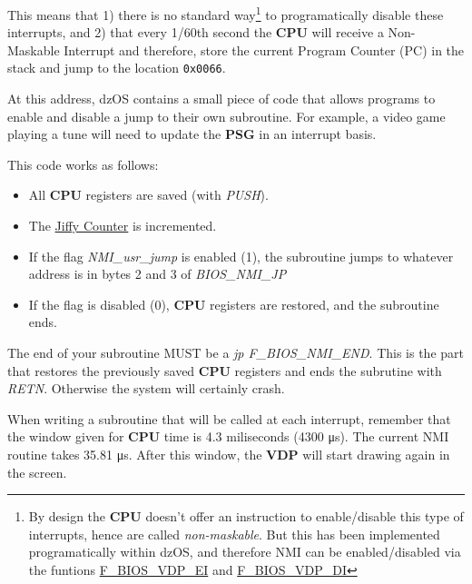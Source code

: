 \documentclass[a4paper,11pt]{article}
\begin{document}
    This means that 1) there is no standard way\footnote{By design the
    \textbf{CPU} doesn't offer an instruction to enable/disable this type of
    interrupts, hence are called \textit{non-maskable}. But this has been
    implemented programatically within dzOS, and therefore NMI can be
    enabled/disabled via the funtions \hyperref[func:fbiosvdpei]
    {F\_BIOS\_VDP\_EI} and \hyperref[func:fbiosvdpdi]{F\_BIOS\_VDP\_DI}} to
    programatically disable these interrupts, and 2) that every 1/60th second
    the \textbf{CPU} will receive a Non-Maskable Interrupt and therefore, store
    the current Program Counter (PC) in the stack and jump to the location
    \texttt{0x0066}.

    At this address, dzOS contains a small piece of code that allows programs to
    enable and disable a jump to their own subroutine. For example, a video game
    playing a tune will need to update the \textbf{PSG} in an interrupt basis.

    This code works as follows:

    \begin{itemize}
        \item All \textbf{CPU} registers are saved (with \textit{PUSH}).
        \item The \hyperref[subsec:jiffy_counter]{Jiffy Counter} is incremented.
        \item If the flag \textit{NMI\_usr\_jump} is enabled (1), the subroutine
        jumps to whatever address is in bytes 2 and 3 of \textit{BIOS\_NMI\_JP}
        \item If the flag is disabled (0), \textbf{CPU} registers are restored,
        and the subroutine ends.
    \end{itemize}

    The end of your subroutine MUST be a \textit{jp F\_BIOS\_NMI\_END}. This is
    the part that restores the previously saved \textbf{CPU} registers and ends
    the subrutine with \textit{RETN}. Otherwise the system will certainly crash.

    When writing a subroutine that will be called at each interrupt, remember
    that the window given for \textbf{CPU} time is 4.3 miliseconds (4300
    \si{\micro\second}). The current NMI routine takes 35.81 \si{\micro\second}.
    After this window, the \textbf{VDP} will start drawing again in the screen.

\end{document}

